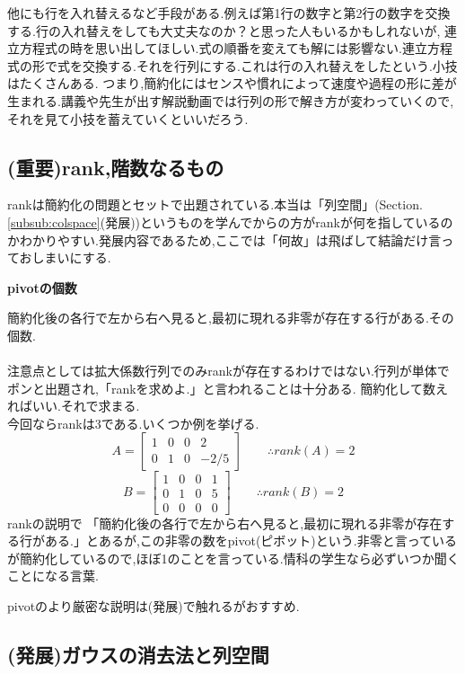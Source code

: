 他にも行を入れ替えるなど手段がある.例えば第1行の数字と第2行の数字を交換する.行の入れ替えをしても大丈夫なのか？と思った人もいるかもしれないが,
連立方程式の時を思い出してほしい.式の順番を変えても解には影響ない.連立方程式の形で式を交換する.それを行列にする.これは行の入れ替えをしたという.小技はたくさんある.
つまり,簡約化にはセンスや慣れによって速度や過程の形に差が生まれる.講義や先生が出す解説動画では行列の形で解き方が変わっていくので,
それを見て小技を蓄えていくといいだろう.
\newpage
\subsection{(重要)rank,階数なるもの}
rankは簡約化の問題とセットで出題されている.本当は「列空間」(Section.\ref{subsub:colspace}(発展))というものを学んでからの方がrankが何を指しているのかわかりやすい.発展内容であるため,ここでは「何故」は飛ばして結論だけ言っておしまいにする.
\begin{tcolorbox}[colframe=black!80,colback=white,title=rank]
\begin{center}
    \textbf{pivotの個数}
\end{center}
\begin{framed}
簡約化後の各行で左から右へ見ると,最初に現れる非零が存在する行がある.その個数.\\\\
注意点としては拡大係数行列でのみrankが存在するわけではない.行列が単体でポンと出題され,「rankを求めよ.」と言われることは十分ある.
簡約化して数えればいい.それで求まる.
\\
今回ならrankは3である.いくつか例を挙げる.
\[
A=
\begin{bmatrix}
    1 & 0 & 0 & 2 \\
    0 & 1 & 0 & -2/5
\end{bmatrix} \qquad
\therefore rank(A) = 2
\]
\[
B=
\begin{bmatrix}
    1 & 0 & 0 & 1 \\
    0 & 1 & 0 & 5 \\
    0 & 0 & 0 & 0
\end{bmatrix} \qquad
\therefore rank(B) = 2
\]
rankの説明で
「簡約化後の各行で左から右へ見ると,最初に現れる非零が存在する行がある.」とあるが,この非零の数をpivot(ピボット)という.非零と言っているが簡約化しているので,ほぼ1のことを言っている.情科の学生なら必ずいつか聞くことになる言葉.
\end{framed}
\end{tcolorbox}
pivotのより厳密な説明は(発展)で触れるがおすすめ.

\subsection{(発展)ガウスの消去法と列空間}
